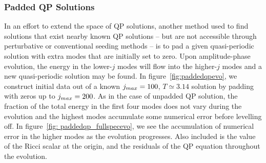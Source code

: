 \documentclass[../PhD.tex]{subfiles}
\begin{document}
\subsubsection{Padded QP Solutions}

In an effort to extend the space of QP solutions, another method used to find solutions that exist nearby known QP solutions -- but are not accessible through perturbative or conventional seeding methods -- is to pad a given quasi-periodic solution with extra modes that are initially set to zero. Upon amplitude-phase evolution, the energy in the lower-$j$ modes will flow into the higher-$j$ modes and a new quasi-periodic solution may be found. In figure~\ref{fig:paddedqpevo}, we construct initial data out of a known $j_{max} = 100$, $T \simeq 3.14$ solution by padding with zeros up to $j_{max} = 200$. As in the case of unpadded QP solution, the fraction of the total energy in the first four modes does not vary during the evolution and the highest modes accumulate some numerical error before levelling off. In figure~\ref{fig: paddedqp_fullspecevo}, we see the accumulation of numerical error in the higher modes as the evolution progresses. Also included is the value of the Ricci scalar at the origin, and the residuals of the QP equation throughout the evolution.
\end{document}
